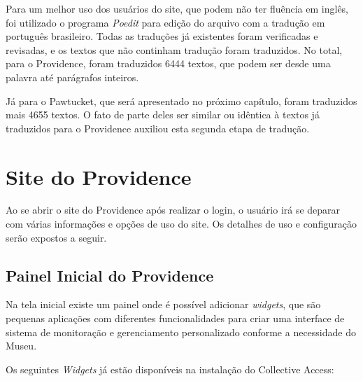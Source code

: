 \documentclass[a4paper,12pt,oneside,onecolumn,final,fleqn]{repUERJ}
\begin{document}
Para um melhor uso dos usuários do site, que podem não ter fluência em inglês, foi utilizado o programa \textit{Poedit} para edição do arquivo com a tradução em português brasileiro. Todas as traduções já existentes foram verificadas e revisadas, e os textos que não continham tradução foram traduzidos. No total, para o Providence, foram traduzidos 6444 textos, que podem ser desde uma palavra até parágrafos inteiros. 

Já para o Pawtucket, que será apresentado no próximo capítulo, foram traduzidos mais 4655 textos. O fato de parte deles ser similar ou idêntica à textos já traduzidos para o Providence auxiliou esta segunda etapa de tradução.

\section{Site do Providence}

Ao se abrir o site do Providence após realizar o login, o usuário irá se deparar com várias informações e opções de uso do site. Os detalhes de uso e configuração serão expostos a seguir.

\subsection{Painel Inicial do Providence}

Na tela inicial existe um painel onde é possível adicionar \textit{widgets}, que são pequenas aplicações com diferentes funcionalidades para criar uma interface de sistema de monitoração e gerenciamento personalizado conforme a necessidade do Museu.

Os seguintes \textit{Widgets} já estão disponíveis na instalação do Collective Access:
\end{document}
